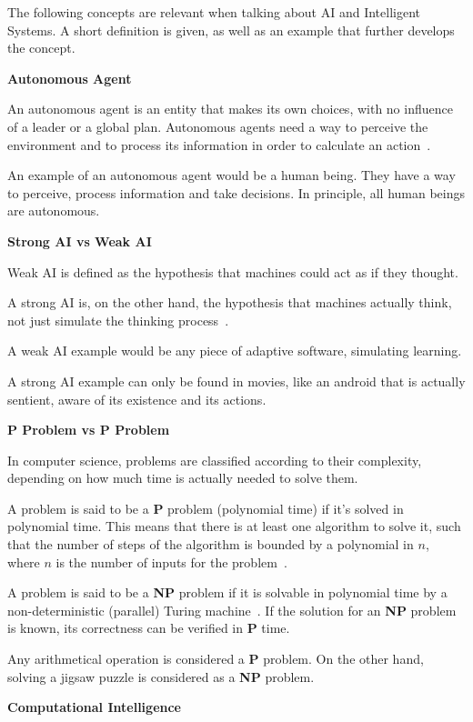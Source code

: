 \documentclass[titlepage, letterpaper, fleqn]{article}
\newcommand{\spacepls}{\vspace{5mm}}
\newcommand{\defy}[1]{
	\textbf{#1} %
}
\newcommand{\defys}[1]{
	\spacepls %
	\textbf{#1}
}
\begin{document}
The following concepts are relevant when talking about AI and Intelligent Systems. A short definition is given, as well as an example that further develops the concept.

\defy{Autonomous Agent}

An autonomous agent is an entity that makes its own choices, with no influence of a leader or a global plan.
Autonomous agents need a way to perceive the environment and to process its information in order to calculate an action~\cite{Shiffman}.

An example of an autonomous agent would be a human being. They have a way to perceive, process information and take decisions. In principle, all human beings are autonomous.

\defys{Strong AI vs Weak AI}

Weak AI is defined as the hypothesis that machines could act as if they thought.

A strong AI is, on the other hand, the hypothesis that machines actually think, not just simulate the thinking process~\cite{StrongAI}.

A weak AI example would be any piece of adaptive software, simulating learning.

A strong AI example can only be found in movies, like an android that is actually sentient, aware of its existence and its actions.

\defys{P Problem vs P Problem}

In computer science, problems are classified according to their complexity, depending on how much time is actually needed to solve them.

A problem is said to be a \textbf{P} problem (polynomial time) if it's solved in polynomial time. This means that there is at least one algorithm to solve it, such that the number of steps of the algorithm is bounded by a polynomial in \(n\), where \(n\) is the number of inputs for the problem~\cite{PProblem}.

A problem is said to be a \textbf{NP} problem if it is solvable in polynomial time by a non-deterministic (parallel) Turing machine~\cite{NPProblem}. If the solution for an \textbf{NP} problem is known, its correctness can be verified in \textbf{P} time.

Any arithmetical operation is considered a \textbf{P} problem. On the other hand, solving a jigsaw puzzle is considered as a \textbf{NP} problem.

\defys{Computational Intelligence}
\end{document}
